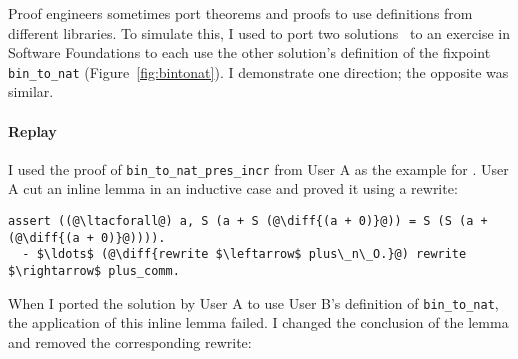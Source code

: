 \begin{figure*}
\begin{minipage}{0.49\textwidth}
\lstset{language=coq, aboveskip=0pt,belowskip=0pt} %





\end{minipage}
\hfill
\begin{minipage}{0.49\textwidth}
\lstset{language=coq, aboveskip=0pt,belowskip=0pt}  %





\end{minipage}
\caption[Caption for LOF]{Definitions of \lstinline{bin_to_nat} for Users A (left) and B (right). Note that \lstinline{bin_to_nat} uses pattern matching and fixpoints
rather than , unlike most of the terms in this thesis.}
\label{fig:bintonat}
\end{figure*}

\lstset{language=coq, aboveskip=3pt,belowskip=3pt}

Proof engineers sometimes port theorems and proofs to use definitions from different libraries.
To simulate this, I used \sysname to port two solutions~\cite{usera, userb}
to an exercise in Software Foundations to each use the other solution's definition of the fixpoint \lstinline{bin_to_nat} (Figure~\ref{fig:bintonat}).
I demonstrate one direction; the opposite was similar.

\paragraph{Replay} I used the proof of \lstinline{bin_to_nat_pres_incr} from User A as the example for \sysname.
User A cut an inline lemma in an inductive case and proved it using a rewrite:

\lstset{language=coq, aboveskip=3pt,belowskip=3pt}
\begin{lstlisting}[language=coq]
  assert ((@\ltacforall@) a, S (a + S (@\diff{(a + 0)}@)) = S (S (a + (@\diff{(a + 0)}@)))).
  - $\ldots$ (@\diff{rewrite $\leftarrow$ plus\_n\_O.}@) rewrite $\rightarrow$ plus_comm.
\end{lstlisting} %
When I ported the solution by User A to use User B's definition of \lstinline{bin_to_nat}, 
the application of this inline lemma failed. I changed the conclusion of the lemma 
and removed the corresponding rewrite:

